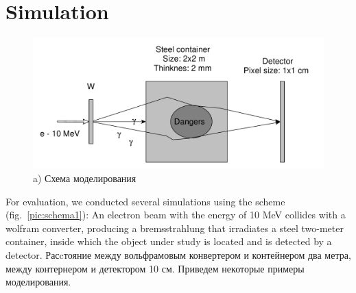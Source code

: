 \documentclass[a4paper]{panl}
\begin{document}
\section*{Simulation}
\begin{figure}[t]
    \begin{center}
        \includegraphics[width=120mm]{figures/yed_schema_1.pdf}
        \vspace{-3mm}
        \caption{a) Схема моделирования }
    \end{center}
    \vspace{-5mm}
\end{figure}
For evaluation, we conducted several simulations using the scheme (fig.~\ref{pic:schema1}):
An electron beam with the energy of 10 MeV collides with a wolfram converter, producing a bremsstrahlung that irradiates a steel two-meter container, inside which the object under study is located and is detected by a detector. Расcтояние между вольфрамовым конвертером и контейнером два метра, между контернером и детектором 10 см. Приведем некоторые примеры моделирования.
\end{document}
